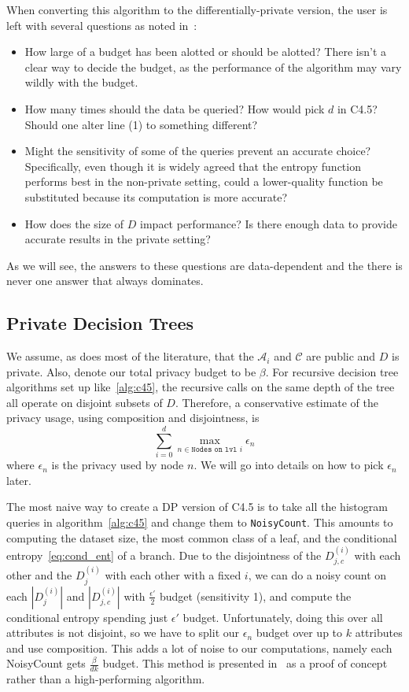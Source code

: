 \documentclass[11pt]{report}
\renewcommand{\t}[1]{\texttt{#1}}
\begin{document}
When converting this algorithm to the differentially-private version, the user is left with several questions as noted in~\cite{Fletcher:2016}:
\begin{itemize}
\item How large of a budget has been alotted or should be alotted? There isn't a clear way to decide the budget, as the performance of the algorithm may vary wildly with the budget.
\item How many times should the data be queried? How would pick $d$ in C4.5? Should one alter line (1) to something different?
\item Might the sensitivity of some of the queries prevent an accurate choice? Specifically, even though it is widely agreed that the entropy function performs best in the non-private setting, could a lower-quality function be substituted because its computation is more accurate?
\item How does the size of $D$ impact performance? Is there enough data to provide accurate results in the private setting?
\end{itemize}
As we will see, the answers to these questions are data-dependent and the there is never one answer that always dominates.

\subsection{Private Decision Trees}
We assume, as does most of the literature, that the $\mathcal{A}_i$ and $\mathcal{C}$ are public and $D$ is private. Also, denote our total privacy budget to be $\beta$.
For recursive decision tree algorithms set up like~\ref{alg:c45}, the recursive calls on the same depth of the tree all operate on disjoint subsets of $D$. Therefore, a conservative estimate of the privacy usage, using composition and disjointness, is
\begin{equation}\label{eq:priv_est}
\sum_{i=0}^d \max_{n \in \t{Nodes on lvl }i} \epsilon_{n}
\end{equation}
where $\epsilon_n$ is the privacy used by node $n$. We will go into details on how to pick $\epsilon_n$ later.

The most naive way to create a DP version of C4.5 is to take all the histogram queries in algorithm~\ref{alg:c45} and change them to \t{NoisyCount}. This amounts to computing the dataset size, the most common class of a leaf, and the conditional entropy~\ref{eq:cond_ent} of a branch. Due to the disjointness of the $D^{(i)}_{j,c}$ with each other and the $D^{(i)}_j$ with each other with a fixed $i$, we can do a noisy count on each $|D^{(i)}_j|$ and $|D^{(i)}_{j,c}|$ with $\frac{\epsilon'}{2}$ budget (sensitivity 1), and compute the conditional entropy spending just $\epsilon'$ budget. Unfortunately, doing this over all attributes is not disjoint, so we have to split our $\epsilon_n$ budget over up to $k$ attributes and use composition. This adds a lot of noise to our computations, namely each NoisyCount gets $\frac{\beta}{dk}$ budget. This method is presented in~\cite{Blum:2005} as a proof of concept rather than a high-performing algorithm.
\end{document}
